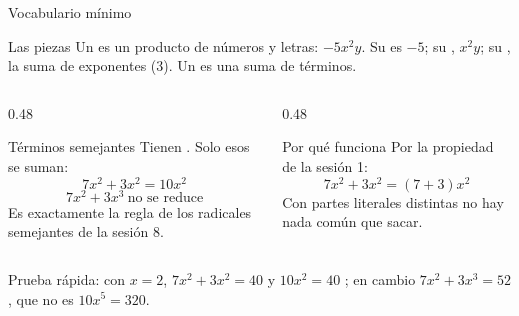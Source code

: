 \documentclass[aspectratio=169,10pt]{beamer}
\begin{document}
\begin{frame}{Vocabulario mínimo}
  \scriptsize
  \begin{block}{Las piezas}
    \tiny
    Un  es un producto de números y letras: $-5x^{2}y$. Su
     es $-5$; su , $x^{2}y$; su
    , la suma de exponentes ($3$). Un  es una suma
    de términos.
  \end{block}

  \vspace{0.1cm}
  \begin{columns}[T,onlytextwidth]
    \begin{column}{0.48\textwidth}
      \begin{exampleblock}{Términos semejantes}
        \tiny
        Tienen . Solo esos se suman:
        \[ 7x^{2} + 3x^{2} = 10x^{2} \]
        \[ 7x^{2} + 3x^{3} \ \text{no se reduce} \]
        Es exactamente la regla de los radicales semejantes de la sesión 8.
      \end{exampleblock}
    \end{column}
    \begin{column}{0.48\textwidth}
      \begin{alertblock}{Por qué funciona}
        \tiny
        Por la propiedad  de la sesión 1:
        \[ 7x^{2}+3x^{2} = (7+3)x^{2} \]
        Con partes literales distintas no hay nada común que sacar.
      \end{alertblock}
    \end{column}
  \end{columns}

  \vspace{0.08cm}
  {\tiny\color{uniGris} Prueba rápida: con $x=2$, $7x^{2}+3x^{2}=40$ y
  $10x^{2}=40$ \checkmark; en cambio $7x^{2}+3x^{3}=52$, que no es
  $10x^{5}=320$. }
\end{frame}
\end{document}
